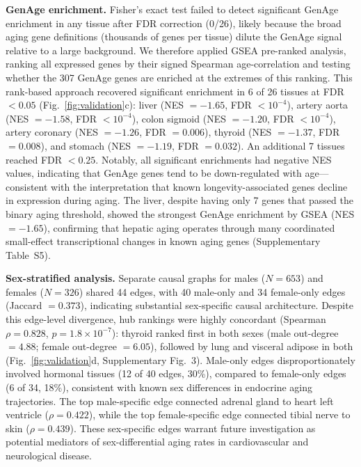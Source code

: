 \documentclass[11pt,a4paper]{article}
\begin{document}
\textbf{GenAge enrichment.} Fisher's exact test failed to detect significant GenAge enrichment in any tissue after FDR correction (0/26), likely because the broad aging gene definitions (thousands of genes per tissue) dilute the GenAge signal relative to a large background. We therefore applied GSEA pre-ranked analysis, ranking all expressed genes by their signed Spearman age-correlation and testing whether the 307 GenAge genes are enriched at the extremes of this ranking. This rank-based approach recovered significant enrichment in 6 of 26 tissues at FDR $< 0.05$ (Fig.~\ref{fig:validation}c): liver (NES $= -1.65$, FDR $< 10^{-4}$), artery aorta (NES $= -1.58$, FDR $< 10^{-4}$), colon sigmoid (NES $= -1.20$, FDR $< 10^{-4}$), artery coronary (NES $= -1.26$, FDR $= 0.006$), thyroid (NES $= -1.37$, FDR $= 0.008$), and stomach (NES $= -1.19$, FDR $= 0.032$). An additional 7 tissues reached FDR $< 0.25$. Notably, all significant enrichments had negative NES values, indicating that GenAge genes tend to be down-regulated with age---consistent with the interpretation that known longevity-associated genes decline in expression during aging. The liver, despite having only 7 genes that passed the binary aging threshold, showed the strongest GenAge enrichment by GSEA (NES $= -1.65$), confirming that hepatic aging operates through many coordinated small-effect transcriptional changes in known aging genes (Supplementary Table~S5).

\textbf{Sex-stratified analysis.} Separate causal graphs for males ($N = 653$) and females ($N = 326$) shared 44 edges, with 40 male-only and 34 female-only edges (Jaccard $= 0.373$), indicating substantial sex-specific causal architecture. Despite this edge-level divergence, hub rankings were highly concordant (Spearman $\rho = 0.828$, $p = 1.8 \times 10^{-7}$): thyroid ranked first in both sexes (male out-degree $= 4.88$; female out-degree $= 6.05$), followed by lung and visceral adipose in both (Fig.~\ref{fig:validation}d, Supplementary Fig.~3). Male-only edges disproportionately involved hormonal tissues (12 of 40 edges, 30\%), compared to female-only edges (6 of 34, 18\%), consistent with known sex differences in endocrine aging trajectories. The top male-specific edge connected adrenal gland to heart left ventricle ($\rho = 0.422$), while the top female-specific edge connected tibial nerve to skin ($\rho = 0.439$). These sex-specific edges warrant future investigation as potential mediators of sex-differential aging rates in cardiovascular and neurological disease.
\end{document}

